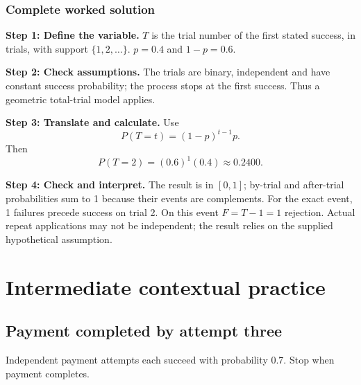 \subsubsection*{Complete worked solution}
\par\noindent\begin{minipage}{\linewidth}
\textbf{Step 1: Define the variable.} $T$ is the trial number of the first stated success, in trials, with support $\{1,2,\ldots\}$. $p=0.4$ and $1-p=0.6$.
\end{minipage}\par\medskip
\par\noindent\begin{minipage}{\linewidth}
\textbf{Step 2: Check assumptions.} The trials are binary, independent and have constant success probability; the process stops at the first success. Thus a geometric total-trial model applies.
\end{minipage}\par\medskip
\par\noindent\begin{minipage}{\linewidth}
\textbf{Step 3: Translate and calculate.} Use
\[P(T=t)=(1-p)^{t-1}p.\]
Then
\[P(T=2)=(0.6)^{1}(0.4)\approx 0.2400.\]
\end{minipage}\par\medskip
\par\noindent\begin{minipage}{\linewidth}
\textbf{Step 4: Check and interpret.} The result is in $[0,1]$; by-trial and after-trial probabilities sum to 1 because their events are complements. For the exact event, 1 failures precede success on trial 2. On this event $F=T-1=1$ rejection. Actual repeat applications may not be independent; the result relies on the supplied hypothetical assumption.
\end{minipage}\par\medskip
{}
\section{Intermediate contextual practice}\label{sec:t2-c5-intermediate}
\subsection{Payment completed by attempt three}
Independent payment attempts each succeed with probability 0.7. Stop when payment completes.

